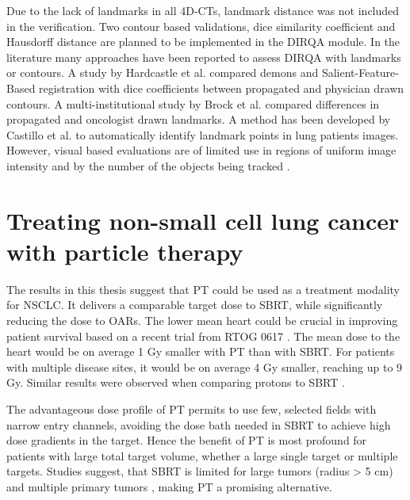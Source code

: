 
Due to the lack of landmarks in all 4D-CTs, landmark distance was not included in the verification. Two contour based validations, dice similarity coefficient \cite{Varadhan2013} and Hausdorff distance \cite{Huttenlocher1993}
are planned to be implemented in the DIRQA module. In the literature many approaches have been reported to assess DIRQA with landmarks or contours. 
A study by Hardcastle et al. \cite{Hardcastle2012} 
compared demons and Salient-Feature-Based registration with dice coefficients between propagated and physician drawn contours.
A multi-institutional study by Brock et al. \cite{Brock2010} compared differences in propagated and oncologist drawn landmarks. 
A method has been developed by Castillo et al. \cite{Castillo2009} to automatically identify landmark points
in lung patients images. However, visual based evaluations are of limited use in regions of uniform image intensity and by the number of the objects being tracked \cite{Kashani2008, Liu2012}.


\section{Treating non-small cell lung cancer with particle therapy}

The results in this thesis suggest that PT could be used as a treatment modality for NSCLC. It delivers a comparable target dose to SBRT, while significantly reducing the
dose to OARs. The lower mean heart could be crucial in improving patient survival based on a recent trial from RTOG 0617 \cite{Bradley2015}. 
The mean dose to the heart would be on average 1 Gy smaller with PT than with SBRT. 
For patients with multiple disease sites, it would be on average 4 Gy smaller, reaching up to 9 Gy. Similar results were observed when comparing protons to SBRT \cite{Georg2008}. 

The advantageous dose profile of PT permits to use few, selected fields with narrow entry channels, avoiding the dose bath needed in SBRT
to achieve high dose gradients in the target.
Hence the benefit of PT is most profound for patients with large total target volume, whether a large single target or multiple targets. Studies suggest, that SBRT is limited for large
tumors (radius > 5 cm) and multiple primary tumors \cite{Timmerman2006, Georg2008, Westover2012}, making PT a promising alternative.

